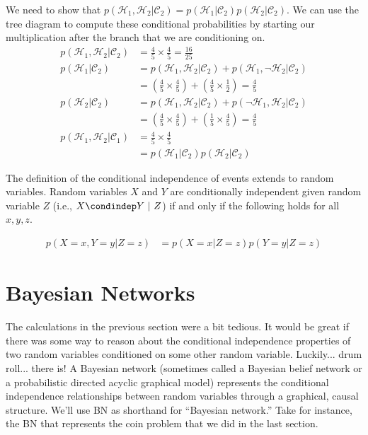 \documentclass[assignment02_Solutions]{subfiles}
\begin{document}
\begin{exercise}[(20 minutes)]
\begin{boxedsolution}
We need to show that $p(\mathcal{H}_1 , \mathcal{H}_2 | \mathcal{C}_2) = p(\mathcal{H}_1 | \mathcal{C}_2) p(\mathcal{H}_2 | \mathcal{C}_2)$.  We can use the tree diagram to compute these conditional probabilities by starting our multiplication after the branch that we are conditioning on.
\begin{align}
p(\mathcal{H}_1 , \mathcal{H}_2 | \mathcal{C}_2)  &= \frac{4}{5} \times \frac{4}{5} = \frac{16}{25} \nonumber \\
p(\mathcal{H}_1 | \mathcal{C}_2) &= p(\mathcal{H}_1, \mathcal{H}_2 | \mathcal{C}_2) + p(\mathcal{H}_1, \neg \mathcal{H}_2 | \mathcal{C}_2) \nonumber \\
&= \left ( \frac{4}{5} \times \frac{4}{5} \right) + \left ( \frac{4}{5} \times \frac{1}{2} \right) = \frac{4}{5} \nonumber \\
p(\mathcal{H}_2 | \mathcal{C}_2) &= p(\mathcal{H}_1, \mathcal{H}_2 | \mathcal{C}_2) + p(\neg \mathcal{H}_1,  \mathcal{H}_2 | \mathcal{C}_2) \nonumber \\
&= \left ( \frac{4}{5} \times \frac{4}{5} \right) + \left ( \frac{1}{5} \times \frac{4}{5} \right) = \frac{4}{5} \nonumber \\
p(\mathcal{H}_1 , \mathcal{H}_2 | \mathcal{C}_1) &=  \frac{4}{5} \times \frac{4}{5} \nonumber \\
&= p(\mathcal{H}_1 | \mathcal{C}_2) p(\mathcal{H}_2 | \mathcal{C}_2) \nonumber
\end{align}
\end{boxedsolution}
\ees
\end{exercise}

The definition of the conditional independence of events extends to random variables.  Random variables $X$ and $Y$ are conditionally independent given random variable $Z$ (i.e., $X \condindep Y ~|~ Z$) if and only if the following holds for all $x, y, z$.

\begin{align}
p(X=x,Y=y | Z=z) &= p(X=x|Z=z) p(Y=y|Z=z)
\end{align}

\section{Bayesian Networks}

The calculations in the previous section were a bit tedious.  It would be great if there was some way to reason about the conditional independence properties of two random variables conditioned on some other random variable.  Luckily... drum roll... there is!  A Bayesian network (sometimes called a Bayesian belief network or a probabilistic directed acyclic graphical model) represents the conditional independence relationships between random variables through a graphical, causal structure.  We'll use BN as shorthand for ``Bayesian network.''  Take for instance, the BN that represents the coin problem that we did in the last section.
\end{document}

